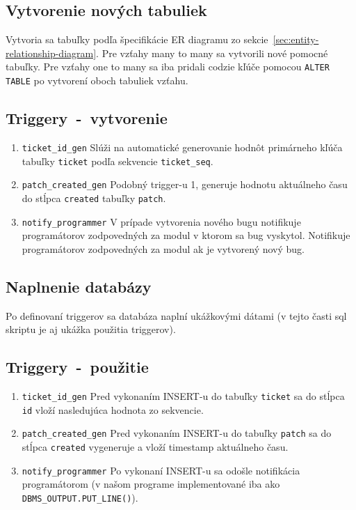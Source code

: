 \documentclass[11pt, a4paper]{article}
\begin{document}
    \subsection{Vytvorenie nových tabuliek}\label{subsec:vytvorenie-nových-tabulieknull}

    Vytvoria sa tabuľky podľa špecifikácie ER diagramu zo sekcie~\ref{sec:entity-relationship-diagram}.
    Pre vzťahy many to many sa vytvorili nové pomocné tabuľky.
    Pre vzťahy one to many sa iba pridali codzie kľúče pomocou \texttt{ALTER TABLE} po vytvorení oboch tabuliek vzťahu.

    \subsection{Triggery\ -\ vytvorenie}\label{subsec:triggery}

    \begin{enumerate}
        \item \texttt{ticket\_id\_gen}
        Slúži na automatické generovanie hodnôt primárneho kľúča tabuľky \texttt{ticket} podľa sekvencie \texttt{ticket\_seq}.
        \item \texttt{patch\_created\_gen}
        Podobný trigger-u 1, generuje hodnotu aktuálneho času do stĺpca \texttt{created} tabuľky \texttt{patch}.
        \item \texttt{notify\_programmer}
        V prípade vytvorenia nového bugu notifikuje programátorov zodpovedných za modul v ktorom sa bug vyskytol.
        Notifikuje programátorov zodpovedných za modul ak je vytvorený nový bug.
    \end{enumerate}

    \subsection{Naplnenie databázy}\label{subsec:naplnenie-databázy}

    Po definovaní triggerov sa databáza naplní ukážkovými dátami (v tejto časti sql skriptu je aj ukážka použitia triggerov).

    \subsection{Triggery\ -\ použitie}\label{subsec:triggery---použitie}

    \begin{enumerate}
        \item \texttt{ticket\_id\_gen}
        Pred vykonaním INSERT-u do tabuľky \texttt{ticket} sa do stĺpca \texttt{id} vloží nasledujúca hodnota zo sekvencie.
        \item \texttt{patch\_created\_gen}
        Pred vykonaním INSERT-u do tabuľky \texttt{patch} sa do stĺpca \texttt{created} vygeneruje a vloží timestamp aktuálneho času.
        \item \texttt{notify\_programmer}
        Po vykonaní INSERT-u sa odošle notifikácia programátorom (v našom programe implementované iba ako \texttt{DBMS\_OUTPUT.PUT\_LINE()}).
    \end{enumerate}
\end{document}
